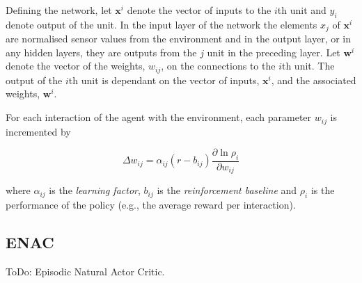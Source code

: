 Defining the network, let $\mathbf{x}^i$ denote the vector of inputs to the
$i$th unit and $y_i$ denote output of the unit.  In the input layer of the
network the elements $x_j$ of $\mathbf{x}^i$ are normalised sensor values from
the environment and in the output layer, or in any hidden layers, they are
outputs from the $j$ unit in the preceding layer.  Let $\mathbf{w}^i$ denote
the vector of the weights, $w_{ij}$, on the connections to the $i$th unit.  The
output of the $i$th unit is dependant on the vector of inputs, $\mathbf{x}^i$,
and the associated weights, $\mathbf{w}^i$.

For each interaction of the agent with the environment, each parameter $w_{ij}$
is incremented by

\begin{equation}
\label{eq:reinforce}
\Delta w_{ij} = \alpha_{ij}(r - b_{ij})\frac{\partial\ln\rho_i}{\partial
w_{ij}}
\end{equation}

where $\alpha_{ij}$ is the \textit{learning factor}, $b_{ij}$ is the
\textit{reinforcement baseline} and $\rho_i$ is the performance of the policy
(e.g., the average reward per interaction).

\subsection{ENAC}
\label{sec:enac}
ToDo: Episodic Natural Actor Critic\cite{peters:enac}.
